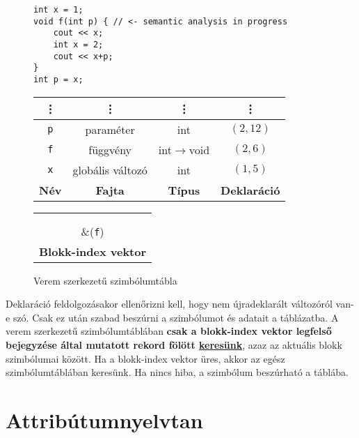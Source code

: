 \begin{figure}[h!]
		\begin{lstlisting}[style=cppstyle]
int x = 1;
void f(int p) { // <- semantic analysis in progress
	cout << x;
	int x = 2;
	cout << x+p;
}
int p = x;
		\end{lstlisting}

	\begin{minipage}{0.6\linewidth}
		\centering
		\begin{tabular}{|c|c|c|c|}
			\hline
			\vdots & \vdots & \vdots & \vdots \\
			\hline
			\texttt{p} & paraméter & int & $(2,12)$ \\
			\hline
			\texttt{f} & függvény & int$\to$void & $(2,6)$ \\
			\hline
			\texttt{x} & globális változó & int & $(1,5)$  \\
			\hline\hline
			\textbf{Név} & \textbf{Fajta} & \textbf{Típus} & \textbf{Deklaráció} \\
			\hline
		\end{tabular}
	\end{minipage}
	\begin{minipage}{0.4\linewidth}
		\centering
		\begin{tabular}{|c|}
			\hline
			 \\
			\hline
			\\
			\hline
			\\
			\hline
			\&(\texttt{f}) \\
			\hline\hline
			\textbf{Blokk-index vektor} \\
			\hline
		\end{tabular}
	\end{minipage}
	\label{symboltablestack}
	\caption{Verem szerkezetű szimbólumtábla}
\end{figure}

Deklaráció feldolgozásakor ellenőrizni kell, hogy nem újradeklarált változóról van-e szó. Csak ez után szabad beszúrni a szimbólumot és adatait a táblázatba. A verem szerkezetű szimbólumtáblában \textbf{csak a blokk-index vektor legfelső bejegyzése által mutatott rekord fölött \underline{keresünk}}, azaz az aktuális blokk szimbólumai között. Ha a blokk-index vektor üres, akkor az egész szimbólumtáblában keresünk. Ha nincs hiba, a szimbólum beszúrható a táblába.

\section{Attribútumnyelvtan}

